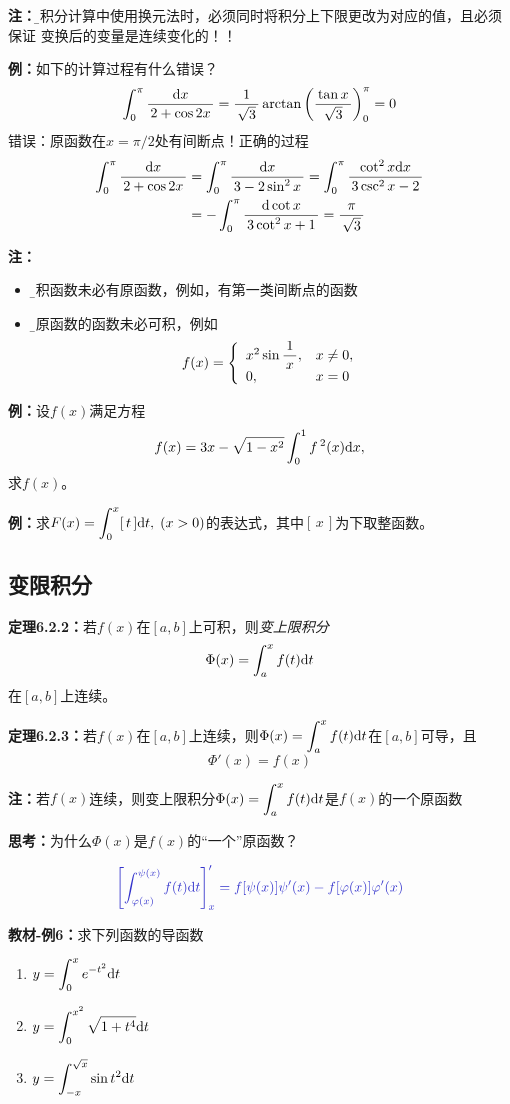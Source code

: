 {\bf 注：}{\b 定积分计算中使用换元法时，必须同时将积分上下限更改为对应的值，且必须保证
变换后的变量是连续变化的！！}

{\bf 例：}如下的计算过程有什么错误？
$$\displaystyle\int_0^{\pi}\displaystyle\frac{\,{\mathrm{d} x}\,}{\,{2+\cos2x}\,}=\displaystyle\frac{\,{1}\,}{\,{\sqrt3}\,}\arctan
\left(\displaystyle\frac{\,{\tan x}\,}{\,{\sqrt3}\,}\right)_0^{\pi}=0$$
错误：原函数在$x=\pi/2$处有间断点！正确的过程
\begin{align}
	\displaystyle\int_0^{\pi}\displaystyle\frac{\,{\mathrm{d} x}\,}{\,{2+\cos2x}\,}&=\displaystyle\int_0^{\pi}\displaystyle\frac{\,{\mathrm{d} x}\,}{\,{3-2\sin^2x}\,}=\displaystyle\int_0^{\pi}\displaystyle\frac{\,{\cot^2x\mathrm{d} x}\,}{\,{3\csc^2x-2}\,}\notag\\
	&=-\displaystyle\int_0^{\pi}\displaystyle\frac{\,{\mathrm{d}\cot x}\,}{\,{3\cot^2x+1}\,}=\displaystyle\frac{\,{\pi}\,}{\,{\sqrt3}\,}\notag
\end{align}

{\bf 注：}
\begin{itemize}
  \setlength{\itemindent}{1cm}
  \item {\b 可积函数未必有原函数}，例如，有第一类间断点的函数
  \item {\b 有原函数的函数未必可积}，例如
  $$f(x)=\left\{\begin{array}{ll}
  x^2\sin\displaystyle\frac{\,{1}\,}{\,{x}\,},& x\ne0,\\ 0,& x=0
  \end{array}\right.$$
\end{itemize}

{\bf 例：}设$f(x)$满足方程
$$f(x)=3x-\sqrt{1-x^2}\displaystyle\int_0^1f\,^2(x)\mathrm{d} x,$$
求$f(x)$。

{\bf 例：}求$F(x)=\displaystyle\int_0^x[\,t\,]\mathrm{d} t,\;(x>0)$的表达式，其中$[\,x\,]$为下取整函数。

\subsection{变限积分}

{\bf 定理6.2.2：}若$f(x)$在$[a,b]$上可积，则{\it 变上限积分}
$$\Phi(x)=\displaystyle\int_a^xf(t)\mathrm{d} t$$
在$[a,b]$上连续。

{\bf 定理6.2.3：}若$f(x)$在$[a,b]$上连续，则$\Phi(x)=\displaystyle\int_a^xf(t)\mathrm{d} t$在$[a,b]$可导，且
$$\Phi'(x)=f(x)$$

{\bf 注：}若$f(x)$连续，则变上限积分$\Phi(x)=\displaystyle\int_a^xf(t)\mathrm{d} t$是$f(x)$的一个原函数

{\bf 思考：}为什么$\Phi(x)$是$f(x)$的“一个”原函数？

$${\b\left[\dint_{\varphi(x)}^{\psi(x)}f(t)\d t\right]'_x
	=f[\psi(x)]\psi'(x)-f[\varphi(x)]\varphi'(x)}$$

{\bf 教材-例6：}求下列函数的导函数
\begin{enumerate}[(1)]
  \setlength{\itemindent}{1cm}
  \item $y=\displaystyle\int_0^{x}e^{-t^2}\mathrm{d} t$
  \item $y=\displaystyle\int_0^{x^2}\sqrt{1+t^4}\mathrm{d} t$
  \item $y=\displaystyle\int_{-x}^{\sqrt x}\sin t^2\mathrm{d} t$
\end{enumerate}

